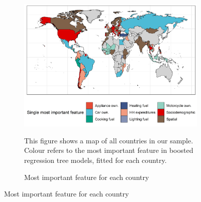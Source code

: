 \clearpage

\begin{figure}[ht!]\ContinuedFloat
   \begin{subfigure}[b]{\textwidth}
  \centering
    \caption{Most important feature for each country} \label{fig:Map_3}
  \includegraphics{1_Figures/Figures_Appendix/Figure_Maps_3.jpg}
  \begin{subcaption2}
    This figure shows a map of all countries in our sample. Colour refers to the most important feature in boosted regression tree models, fitted for each country.
  \end{subcaption2}
\end{subfigure}
\end{figure}